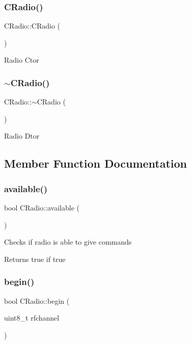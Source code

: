 \subsubsection{\texorpdfstring{C\+Radio()}{CRadio()}}
{\footnotesize\ttfamily C\+Radio\+::\+C\+Radio (\begin{DoxyParamCaption}{ }\end{DoxyParamCaption})}

Radio Ctor \mbox{\label{class_c_radio_a434cee719712c101fdf58f8e4aed385a}} 
\subsubsection{\texorpdfstring{$\sim$\+C\+Radio()}{~CRadio()}}
{\footnotesize\ttfamily C\+Radio\+::$\sim$\+C\+Radio (\begin{DoxyParamCaption}{ }\end{DoxyParamCaption})}

Radio Dtor 

\subsection{Member Function Documentation}
\mbox{\label{class_c_radio_ac8af18a6d53281e18c2931d5a8779da1}} 
\subsubsection{\texorpdfstring{available()}{available()}}
{\footnotesize\ttfamily bool C\+Radio\+::available (\begin{DoxyParamCaption}{ }\end{DoxyParamCaption})}

Checks if radio is able to give commands \begin{DoxyReturn}{Returns}
true if true 
\end{DoxyReturn}
\mbox{\label{class_c_radio_ad31108fd9abdbbd4375982db055bc6c4}} 
\subsubsection{\texorpdfstring{begin()}{begin()}}
{\footnotesize\ttfamily bool C\+Radio\+::begin (\begin{DoxyParamCaption}\item[{uint8\+\_\+t}]{rfchannel }\end{DoxyParamCaption})}

